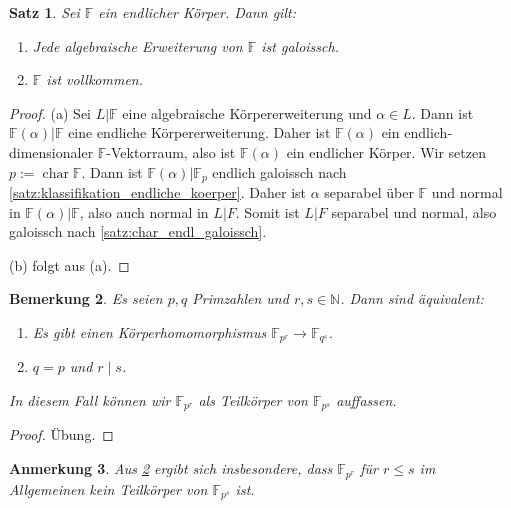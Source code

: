 \documentclass[a4paper, twoside, 11pt, ngerman]{report}
\newcommand{\FF}{\mathds F}
\newcommand{\NN}{\mathds N}
\DeclareMathOperator{\charact}{char}
\theoremstyle{definistyle}
\newtheorem{satz}{Satz}[section]
\newtheorem{bem}[satz]{Bemerkung}
\newtheorem{anm}[satz]{Anmerkung}
\theoremstyle{remark}
\begin{document}
\begin{satz}\label{satz:endl_kp_vollkommen}
Sei $\FF$ ein endlicher Körper. Dann gilt:
\begin{enumerate}
\item[(a)] Jede algebraische Erweiterung von $\FF$ ist galoissch.
\item[(b)] $\FF$ ist vollkommen.
\end{enumerate}
\end{satz}


\begin{proof}
(a) Sei $L|\FF$ eine algebraische Körpererweiterung und $\alpha \in L$. Dann ist $\FF(\alpha)|\FF$ eine endliche Körpererweiterung. Daher ist $\FF(\alpha)$ ein endlich-dimensionaler $\FF$-Vektorraum, also ist $\FF(\alpha)$ ein endlicher Körper. Wir setzen $p := \charact \FF$. Dann ist $\FF(\alpha)|\FF_p$ endlich galoissch nach \ref{satz:klassifikation_endliche_koerper}. Daher ist $\alpha$ separabel über $\FF$ und normal in $\FF(\alpha)|\FF$, also auch normal in $L|F$. Somit ist $L|F$ separabel und normal, also galoissch nach \ref{satz:char_endl_galoissch}.

(b) folgt aus (a).
\end{proof}

\begin{bem}\label{bem:erw_endl_koerper}
Es seien $p,q$ Primzahlen und $r,s\in\NN$. Dann sind äquivalent:
\begin{enumerate}
\item[(i)] Es gibt einen Körperhomomorphismus $\FF_{p^r} \to \FF_{q^s}$.
\item[(ii)] $q = p$ und $r \mid s$.
\end{enumerate}
In diesem Fall können wir $\FF_{p^r}$ als Teilkörper von $\FF_{p^s}$ auffassen.
\end{bem}
\begin{proof}
Übung.
\end{proof}

\begin{anm}
Aus \ref{bem:erw_endl_koerper} ergibt sich insbesondere, dass $\FF_{p^r}$ für $r\leq s$ im Allgemeinen kein Teilkörper von $\FF_{p^s}$ ist.
\end{anm}
\end{document}
